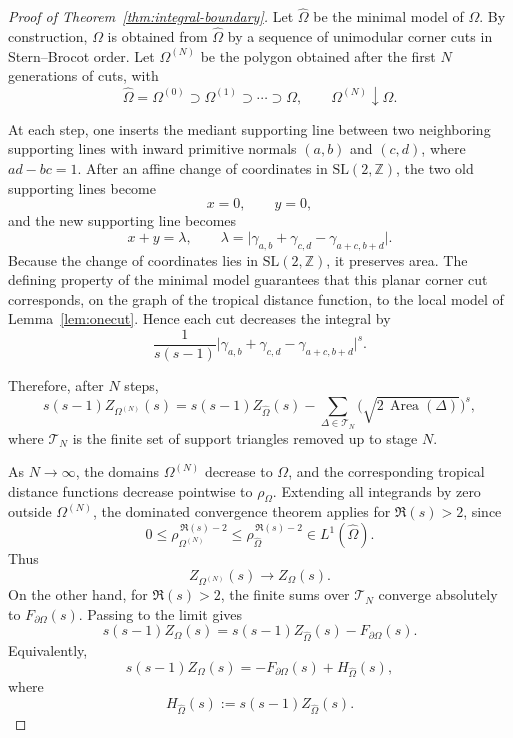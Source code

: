 \documentclass[a4paper,american,11pt]{amsart}
\theoremstyle{plain}
\theoremstyle{definition}
\newcommand{\Z}{\mathbb Z}
\DeclareMathOperator{\Area}{Area}
\begin{document}
\begin{proof}[Proof of Theorem~\ref{thm:integral-boundary}]
\label{proof:thm:integral-boundary}
Let \(\widehat\Omega\) be the minimal model of \(\Omega\). By construction,
\(\Omega\) is obtained from \(\widehat\Omega\) by a sequence of unimodular
corner cuts in Stern--Brocot order. Let \(\Omega^{(N)}\) be the polygon
obtained after the first \(N\) generations of cuts, with
\[
\widehat\Omega=\Omega^{(0)}\supset \Omega^{(1)}\supset \cdots \supset \Omega,
\qquad
\Omega^{(N)}\downarrow \Omega.
\]

At each step, one inserts the mediant supporting line between two neighboring
supporting lines with inward primitive normals \((a,b)\) and \((c,d)\), where
\(ad-bc=1\). After an affine change of coordinates in \(\mathrm{SL}(2,\Z)\),
the two old supporting lines become
\[
x=0,\qquad y=0,
\]
and the new supporting line becomes
\[
x+y=\lambda,
\qquad
\lambda=
\bigl|
\gamma_{a,b}+\gamma_{c,d}-\gamma_{a+c,b+d}
\bigr|.
\]
Because the change of coordinates lies in \(\mathrm{SL}(2,\Z)\), it preserves
area. The defining property of the minimal model guarantees that this planar
corner cut corresponds, on the graph of the tropical distance function, to the
local model of Lemma~\ref{lem:onecut}. Hence each cut decreases the integral
by
\[
\frac{1}{s(s-1)}
\bigl|
\gamma_{a,b}+\gamma_{c,d}-\gamma_{a+c,b+d}
\bigr|^s.
\]

Therefore, after \(N\) steps,
\[
s(s-1)Z_{\Omega^{(N)}}(s)
=
s(s-1)Z_{\widehat\Omega}(s)
-
\sum_{\Delta\in\mathcal T_N}
\bigl(\sqrt{2\,\Area(\Delta)}\bigr)^s,
\]
where \(\mathcal T_N\) is the finite set of support triangles removed up to
stage \(N\).

As \(N\to\infty\), the domains \(\Omega^{(N)}\) decrease to \(\Omega\), and
the corresponding tropical distance functions decrease pointwise to
\(\rho_\Omega\). Extending all integrands by zero outside \(\Omega^{(N)}\),
the dominated convergence theorem applies for \(\Re(s)>2\), since
\[
0\le
\rho_{\Omega^{(N)}}^{\,\Re(s)-2}
\le
\rho_{\widehat\Omega}^{\,\Re(s)-2}
\in L^1(\widehat\Omega).
\]
Thus
\[
Z_{\Omega^{(N)}}(s)\longrightarrow Z_\Omega(s).
\]
On the other hand, for \(\Re(s)>2\), the finite sums over \(\mathcal T_N\)
converge absolutely to \(F_{\partial\Omega}(s)\). Passing to the limit gives
\[
s(s-1)Z_\Omega(s)
=
s(s-1)Z_{\widehat\Omega}(s)-F_{\partial\Omega}(s).
\]
Equivalently,
\[
s(s-1)Z_\Omega(s)
=
-
F_{\partial\Omega}(s)+H_{\widehat\Omega}(s),
\]
where
\[
H_{\widehat\Omega}(s):=s(s-1)Z_{\widehat\Omega}(s).
\]
\end{proof}
\end{document}
